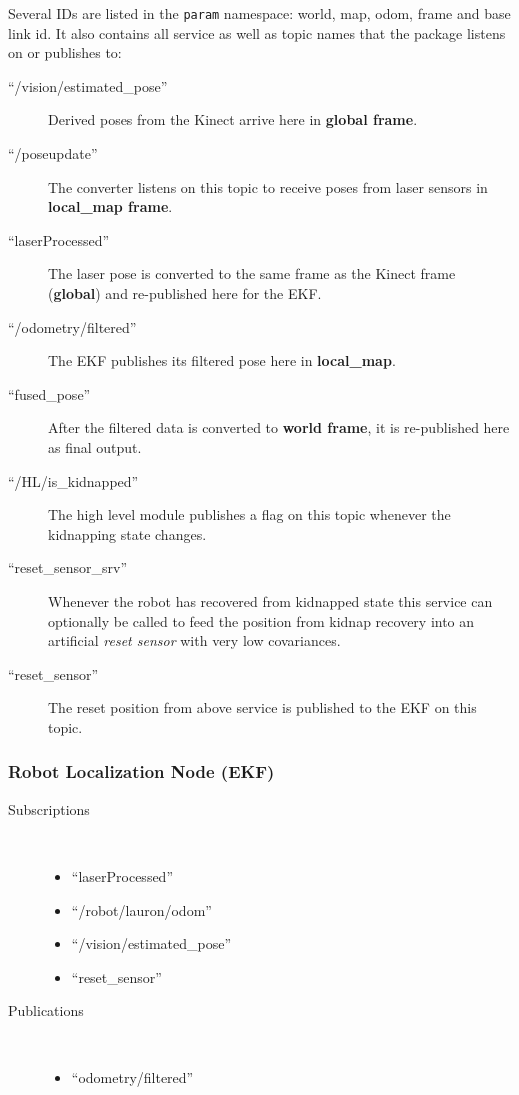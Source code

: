 Several IDs are listed in the \texttt{param} namespace: world, map, odom, frame and base link id. It also contains all service as well as topic names that the package listens on or publishes to:

\begin{description}
\item[``/vision/estimated\_pose''] Derived poses from the Kinect arrive here in \textbf{global frame}.
\item[``/poseupdate''] The converter listens on this topic to receive poses from laser sensors in \textbf{local\_map frame}. 
\item[``laserProcessed''] The laser pose is converted to the same frame as the Kinect frame (\textbf{global}) and re-published here for the EKF.
\item[``/odometry/filtered''] The EKF publishes its filtered pose here in \textbf{local\_map}.
\item[``fused\_pose''] After the filtered data is converted to \textbf{world frame}, it is re-published here as final output.
\item[``/HL/is\_kidnapped''] The high level module publishes a flag on this topic whenever the kidnapping state changes.
\item[``reset\_sensor\_srv''] Whenever the robot has recovered from kidnapped state this service can optionally be called to feed the position from kidnap recovery  into an artificial \textit{reset sensor} with very low covariances.
\item[``reset\_sensor''] The reset position from above service is published to the EKF on this topic.
\end{description}

\subsubsection{Robot Localization Node (EKF)}
\begin{description}
\item[Subscriptions]\
\begin{itemize}
	\item ``laserProcessed''
	\item``/robot/lauron/odom''
	\item ``/vision/estimated\_pose''
	 \item ``reset\_sensor'' 
\end{itemize}
	
\item[Publications]\
	\begin{itemize}
	\item ``odometry/filtered''
	\end{itemize}
\end{description}

